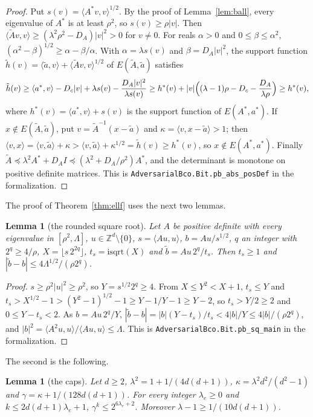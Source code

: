 \documentclass[11pt]{amsart}
\newtheorem{lemma}[theorem]{Lemma}
\theoremstyle{definition}
\numberwithin{equation}{section}
\newcommand{\ip}[1]{\langle #1\rangle}
\begin{document}
\begin{proof}
Put $s(v)=\ip{A^*v,v}^{1/2}$. By the proof of Lemma~\ref{lem:ball}, every eigenvalue of $A^*$ is at least $\rho^2$, so $s(v)\ge\rho|v|$. Then $\ip{\tilde Av,v}\ge(\lambda^2\rho^2-D_A)|v|^2>0$ for $v\ne0$. For reals $\alpha>0$ and $0\le\beta\le\alpha^2$, $(\alpha^2-\beta)^{1/2}\ge\alpha-\beta/\alpha$. With $\alpha=\lambda s(v)$ and $\beta=D_A|v|^2$, the support function $\tilde h(v)=\ip{\tilde a,v}+\ip{\tilde Av,v}^{1/2}$ of $E(\tilde A,\tilde a)$ satisfies
\[
\tilde h(v)\ge\ip{a^*,v}-D_c|v|+\lambda s(v)-\frac{D_A|v|^2}{\lambda s(v)}\ge h^*(v)+|v|\Bigl((\lambda-1)\rho-D_c-\frac{D_A}{\lambda\rho}\Bigr)\ge h^*(v),
\]
where $h^*(v)=\ip{a^*,v}+s(v)$ is the support function of $E(A^*,a^*)$. If $x\notin E(\tilde A,\tilde a)$, put $v=\tilde A^{-1}(x-\tilde a)$ and $\kappa=\ip{v,x-\tilde a}>1$; then $\ip{v,x}=\ip{v,\tilde a}+\kappa>\ip{v,\tilde a}+\kappa^{1/2}=\tilde h(v)\ge h^*(v)$, so $x\notin E(A^*,a^*)$. Finally $\tilde A\preceq\lambda^2A^*+D_AI\preceq(\lambda^2+D_A/\rho^2)A^*$, and the determinant is monotone on positive definite matrices.
This is \texttt{AdversarialBco.Bit.pb\_abs\_posDef} in the formalization.
\end{proof}

The proof of Theorem~\ref{thm:ellf} uses the next two lemmas.

\begin{lemma}[the rounded square root]\label{lem:sq}
Let $A$ be positive definite with every eigenvalue in $[\rho^2,\Lambda]$, $u\in\mathbb Z^d\setminus\{0\}$, $s=\ip{Au,u}$, $b=Au/s^{1/2}$, $q$ an integer with $2^q\ge4/\rho$, $X=\lfloor s\,2^{2q}\rfloor$, $t_s=\mathrm{isqrt}(X)$ and $\tilde b=Au\,2^q/t_s$. Then $t_s\ge1$ and $|\tilde b-b|\le4\Lambda^{1/2}/(\rho2^q)$.
\end{lemma}

\begin{proof}
$s\ge\rho^2|u|^2\ge\rho^2$, so $Y=s^{1/2}2^q\ge4$. From $X\le Y^2<X+1$, $t_s\le Y$ and $t_s>X^{1/2}-1>(Y^2-1)^{1/2}-1\ge Y-1/Y-1\ge Y-2$, so $t_s>Y/2\ge2$ and $0\le Y-t_s<2$. As $b=Au\,2^q/Y$, $|\tilde b-b|=|b|(Y-t_s)/t_s<4|b|/Y\le4|b|/(\rho2^q)$, and $|b|^2=\ip{A^2u,u}/\ip{Au,u}\le\Lambda$.
This is \texttt{AdversarialBco.Bit.pb\_sq\_main} in the formalization.
\end{proof}

The second is the following.

\begin{lemma}[the caps]\label{lem:cap}
Let $d\ge2$, $\lambda^2=1+1/(4d(d+1))$, $\kappa=\lambda^2d^2/(d^2-1)$ and $\gamma=\kappa+1/(128d(d+1))$. For every integer $\lambda_e\ge0$ and $k\le2d(d+1)\lambda_e+1$, $\gamma^k\le2^{6\lambda_e+2}$. Moreover $\lambda-1\ge1/(10d(d+1))$.
\end{lemma}
\end{document}
